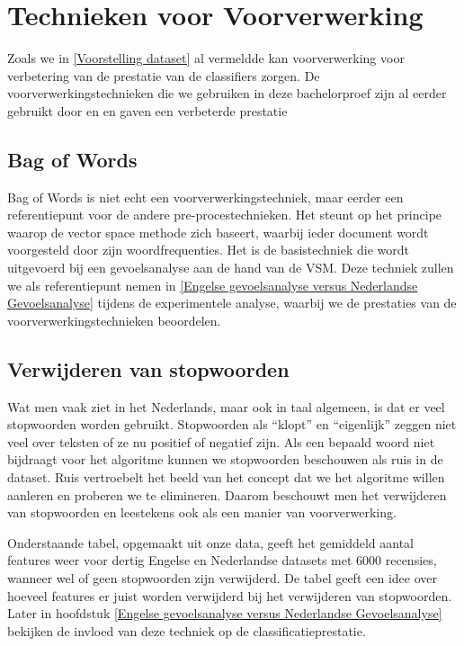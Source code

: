 \section{Technieken voor Voorverwerking}\label{Technieken voor Pre-Processing}

Zoals we in \ref{Voorstelling dataset} al vermeldde kan voorverwerking voor verbetering van de prestatie van de classifiers zorgen. De voorverwerkingstechnieken die we gebruiken in deze bachelorproef zijn al eerder gebruikt door \cite{pang2002thumbs} en \cite{wang2011sentiment} en gaven een verbeterde prestatie

\subsection{Bag of Words}\label{Bag of Words}

Bag of Words is niet echt een voorverwerkingstechniek, maar eerder een referentiepunt voor de andere pre-procestechnieken. Het steunt op het principe waarop de vector space methode zich baseert, waarbij ieder document wordt voorgesteld door zijn woordfrequenties. Het is de basistechniek die wordt uitgevoerd bij een gevoelsanalyse aan de hand van de VSM. Deze techniek zullen we als referentiepunt nemen in \ref{Engelse gevoelsanalyse versus Nederlandse Gevoelsanalyse} tijdens de experimentele analyse, waarbij we de prestaties van de voorverwerkingstechnieken beoordelen.

\subsection{Verwijderen van stopwoorden}\label{Verwijderen van stopwoorden en leestekens}

Wat men vaak ziet in het Nederlands, maar ook in taal algemeen, is dat er veel stopwoorden worden gebruikt. Stopwoorden als ``klopt'' en ``eigenlijk'' zeggen niet veel over teksten of ze nu positief of negatief zijn. Als een bepaald woord niet bijdraagt voor het algoritme kunnen we stopwoorden beschouwen als ruis in de dataset. Ruis vertroebelt het beeld van het concept dat we het algoritme willen aanleren en proberen we te elimineren. Daarom beschouwt men het verwijderen van stopwoorden en leestekens ook als een manier van voorverwerking.

Onderstaande tabel, opgemaakt uit onze data, geeft het gemiddeld aantal features weer voor dertig Engelse en Nederlandse datasets met 6000 recensies, wanneer wel of geen stopwoorden zijn verwijderd. De tabel geeft een idee over hoeveel features er juist worden verwijderd bij het verwijderen van stopwoorden. Later in hoofdstuk \ref{Engelse gevoelsanalyse versus Nederlandse Gevoelsanalyse} bekijken de invloed van deze techniek op de classificatieprestatie.

